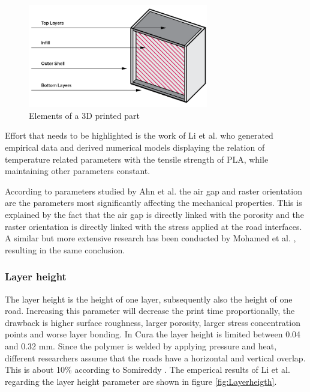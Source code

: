 \begin{figure}[htb]
    \centering
    \includegraphics[width=0.7\textwidth]{chapter_2/figures/Shell.PNG}
    \caption{Elements of a 3D printed part \cite{3DHubsIntroductionPrinting}}
    \label{fig:Shell}
\end{figure}
Effort that needs to be highlighted is the work of  Li et al. \cite{Li2017TheProperties} who generated empirical data and derived numerical models displaying the relation of temperature related parameters with the tensile strength of PLA, while maintaining other parameters constant.

According to parameters studied by Ahn et al. \cite{Ahn2002AnisotropicABS} the air gap and raster orientation are the parameters most significantly affecting the mechanical properties. This is explained by the fact that the air gap is directly linked with the porosity and the raster orientation is directly linked with the stress applied at the road interfaces.
A similar but more extensive research has been conducted by Mohamed et al. \cite{Mohamed2016EffectExperiment}, resulting in the same conclusion.

\subsubsection{Layer height}
The layer height is the height of one layer, subsequently also the height of one road. Increasing this parameter will decrease the print time proportionally, the drawback is higher surface roughness, larger porosity, larger stress concentration points and worse layer bonding. In Cura the layer height is limited between 0.04 and 0.32 mm. Since the polymer is welded by applying pressure and heat, different researchers assume that the roads have a horizontal and vertical overlap. This is about 10\% according to Somireddy \cite{Somireddy2017MechanicalMesostructure}.  The emperical results of Li et al. \cite{Li2017TheProperties} regarding the layer height parameter are shown in figure \ref{fig:Layerheigth}.

